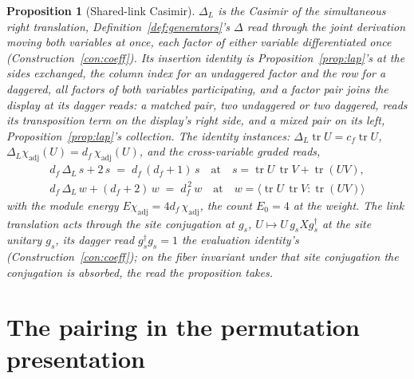\documentclass[11pt]{article}
\newtheorem{proposition}{Proposition}
\theoremstyle{definition}
\newcommand{\tr}{\operatorname{tr}}
\begin{document}
\begin{proposition}[Shared-link Casimir]\label{prop:link}
$\Delta_L$ is the Casimir of the simultaneous right translation,
Definition~\ref{def:generators}'s $\Delta$ read through the joint
derivation moving both variables at once, each factor of either
variable differentiated once (Construction~\ref{con:coeff}). Its
insertion identity is Proposition~\ref{prop:lap}'s at the sides
exchanged, the column index for an undaggered factor and the row for
a daggered, all factors of both variables participating, and a factor
pair joins the display at its dagger reads: a matched pair, two
undaggered or two daggered, reads its transposition term on the
display's right side, and a mixed pair on its left,
Proposition~\ref{prop:lap}'s collection. The identity
instances: $\Delta_L\tr U=c_f\tr U$,
$\Delta_L\chi_{\mathrm{adj}}(U)=d_f\,\chi_{\mathrm{adj}}(U)$, and the
cross-variable graded reads,
\begin{gather*}
d_f\,\Delta_L\,s+2\,s\;=\;d_f\,(d_f+1)\,s
\quad\text{at}\quad s=\tr U\,\tr V+\tr(UV) ,\\
d_f\,\Delta_L\,w+(d_f+2)\,w\;=\;d_f^{\,2}\,w
\quad\text{at}\quad w=\big\langle\tr U\,\tr V\!:\!\tr(UV)\big\rangle
\end{gather*}
with the module energy
$E\chi_{\mathrm{adj}}=4d_f\,\chi_{\mathrm{adj}}$, the count
$E_0=4$ at the weight. The link translation
acts through the site conjugation at $g_s$,
$U\mapsto U\,g_sXg_s^{\dagger}$ at the site unitary $g_s$, its
dagger read $g_s^{\dagger}g_s=1$ the evaluation identity's
(Construction~\ref{con:coeff}); on the fiber invariant under that
site conjugation the conjugation is absorbed, the read the proposition
takes.
\end{proposition}

\section{The pairing in the permutation presentation}\label{sec:wg}
\end{document}
